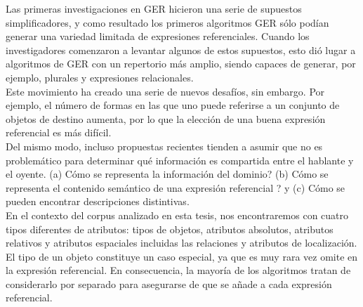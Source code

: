 
%
Las primeras investigaciones en GER hicieron una serie de supuestos simplificadores, y como resultado los primeros
algoritmos GER s\'olo pod\'ian generar una variedad limitada de expresiones referenciales. Cuando
los investigadores comenzaron a levantar algunos de estos supuestos, esto di\'o lugar a algoritmos de GER
con un repertorio m\'as amplio, siendo capaces de generar, por ejemplo, plurales y expresiones relacionales. \\

Este movimiento ha creado una serie de nuevos desaf\'ios, sin embargo. Por ejemplo, el
n\'umero de formas en las que uno puede referirse a un conjunto de objetos de destino aumenta, por lo que la elecci\'on de una
buena expresi\'on referencial es m\'as dif\'icil.\\

Del mismo modo, incluso propuestas recientes tienden a asumir que no es problem\'atico para determinar qu\'e informaci\'on
es compartida entre el hablante y el oyente.
 (a) C\'omo se representa la informaci\'on del dominio?
(b) C\'omo se representa el contenido sem\'antico de una expresi\'on referencial ? y (c) C\'omo se pueden encontrar descripciones distintivas.\\

 En el contexto del corpus analizado en esta tesis, nos encontraremos con cuatro tipos diferentes de atributos:
tipos de objetos, atributos absolutos, atributos relativos y atributos espaciales incluidas las relaciones y atributos de localizaci\'on.\\

El tipo de un objeto constituye un caso especial, ya que es muy rara vez omite
en la expresi\'on referencial. En consecuencia, la mayor\'ia de los algoritmos tratan de
considerarlo por separado para asegurarse de que se a\~nade a cada expresi\'on referencial. \\

